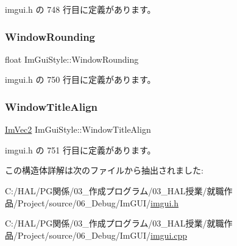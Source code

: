  imgui.\+h の 748 行目に定義があります。

\mbox{\label{struct_im_gui_style_acd902c2ab4b53d4bb0f64da608320894}} 
\subsubsection{\texorpdfstring{Window\+Rounding}{WindowRounding}}
{\footnotesize\ttfamily float Im\+Gui\+Style\+::\+Window\+Rounding}



 imgui.\+h の 750 行目に定義があります。

\mbox{\label{struct_im_gui_style_a3fc57a15ab8f206045f1e5dfccd8b2e7}} 
\subsubsection{\texorpdfstring{Window\+Title\+Align}{WindowTitleAlign}}
{\footnotesize\ttfamily \mbox{\hyperlink{struct_im_vec2}{Im\+Vec2}} Im\+Gui\+Style\+::\+Window\+Title\+Align}



 imgui.\+h の 751 行目に定義があります。



この構造体詳解は次のファイルから抽出されました\+:\begin{DoxyCompactItemize}
\item 
C\+:/\+H\+A\+L/\+P\+G関係/03\+\_\+作成プログラム/03\+\_\+\+H\+A\+L授業/就職作品/\+Project/source/06\+\_\+\+Debug/\+Im\+G\+U\+I/\mbox{\hyperlink{imgui_8h}{imgui.\+h}}\item 
C\+:/\+H\+A\+L/\+P\+G関係/03\+\_\+作成プログラム/03\+\_\+\+H\+A\+L授業/就職作品/\+Project/source/06\+\_\+\+Debug/\+Im\+G\+U\+I/\mbox{\hyperlink{imgui_8cpp}{imgui.\+cpp}}\end{DoxyCompactItemize}
